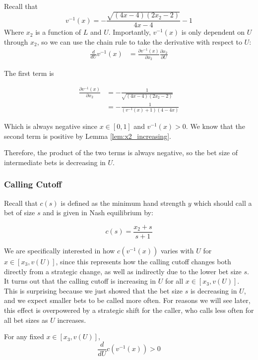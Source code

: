 \documentclass[../../main/main.tex]{subfiles}
\begin{document}
\begin{customproof}
    Recall that 
    $$v^{-1}(x) = -\frac{\sqrt{(4 x-4) (2 x_2-2)}}{4 x-4}-1$$
    Where $x_2$ is a function of $L$ and $U$. Importantly, $v^{-1}(x)$ is only dependent on $U$ through $x_2$, so we can use the chain rule to take the derivative with respect to $U$:
    \begin{align*}
        \frac{d}{dU} v^{-1}(x) & = \frac{\partial v^{-1}(x)}{\partial x_2} \frac{\partial x_2}{\partial U}
    \end{align*}

    The first term is 

\begin{align*}
    \frac{\partial v^{-1}(x)}{\partial x_2} & = - \frac{1}{\sqrt{(4 x-4) (2 x_2-2)}} \\
    &= - \frac{1}{(v^{-1}(x)+1)(4-4x)}
\end{align*}

    Which is always negative since $x \in [0, 1]$ and $v^{-1}(x) >0 $. We know that the second term is positive by Lemma \ref{lem:x2_increasing}.

    Therefore, the product of the two terms is always negative, so the bet size of intermediate bets is decreasing in $U$.
\end{customproof}

\subsubsection{Calling Cutoff}

Recall that $c(s)$ is defined as the minimum hand strength $y$ which should call a bet of size $s$ and is given in Nash equilibrium by:

$$c(s) = \frac{x_2 + s}{s+1}$$

We are specifically interested in how $c(v^{-1}(x))$ varies with $U$ for $x \in [x_3, v(U)]$, since this represents how the calling cutoff changes both directly from a strategic change, as well as indirectly due to the lower bet size $s$. It turns out that the calling cutoff is increasing in $U$ for all $x \in [x_3, v(U)]$. This is surprising because we just showed that the bet size $s$ is decreasing in $U$, and we expect smaller bets to be called more often. For reasons we will see later, this effect is overpowered by a strategic shift for the caller, who calls less often for all bet sizes as $U$ increases. 

\begin{lemma}
    \label{lem:c_increasing}
    For any fixed $x \in [x_3, v(U)]$, 
    \[ 
        \frac{d}{dU} c(v^{-1}(x)) > 0
    \]
\end{lemma}
\end{document}
